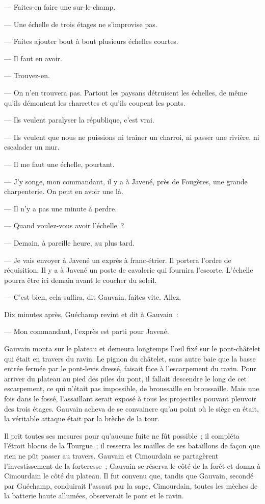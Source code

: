 \documentclass[french,twoside]{book} %
\begin{document}
— Faites-en faire une sur-le-champ.\par
— Une échelle de trois étages ne s’improvise pas.\par
— Faites ajouter bout à bout plusieurs échelles courtes.\par
— Il faut en avoir.\par
— Trouvez-en.\par
— On n’en trouvera pas. Partout les paysans détruisent les échelles, de même qu’ils démontent les charrettes et qu’ils coupent les ponts.\par
— Ils veulent paralyser la république, c’est vrai.\par
 — Ils veulent que nous ne puissions ni traîner un charroi, ni passer une rivière, ni escalader un mur.\par
— Il me faut une échelle, pourtant.\par
— J’y songe, mon commandant, il y a à Javené, près de Fougères, une grande charpenterie. On peut en avoir une là.\par
— Il n’y a pas une minute à perdre.\par
— Quand voulez-vous avoir l’échelle ?\par
— Demain, à pareille heure, au plus tard.\par
— Je vais envoyer à Javené un exprès à franc-étrier. Il portera l’ordre de réquisition. Il y a à Javené un poste de cavalerie qui fournira l’escorte. L’échelle pourra être ici demain avant le coucher du soleil.\par
— C’est bien, cela suffira, dit Gauvain, faites vite. Allez.\par
Dix minutes après, Guéchamp revint et dit à Gauvain :\par
— Mon commandant, l’exprès est parti pour Javené.\par
Gauvain monta sur le plateau et demeura longtemps l’œil fixé sur le pont-châtelet qui était en travers du ravin. Le pignon du châtelet, sans autre baie que la basse entrée fermée par le pont-levis dressé, faisait face à l’escarpement du ravin. Pour arriver du plateau au pied des piles du pont, il fallait descendre le long de cet escarpement, ce qui n’était pas impossible, de broussaille en broussaille. Mais une fois dans le fossé, l’assaillant serait exposé à tous les projectiles pouvant pleuvoir des trois étages. Gauvain acheva de se convaincre qu’au point où le siège en était, la véritable attaque était par la brèche de la tour.\par
 Il prit toutes ses mesures pour qu’aucune fuite ne fût possible ; il compléta l’étroit blocus de la Tourgue ; il resserra les mailles de ses bataillons de façon que rien ne pût passer au travers. Gauvain et Cimourdain se partagèrent l’investissement de la forteresse ; Gauvain se réserva le côté de la forêt et donna à Cimourdain le côté du plateau. Il fut convenu que, tandis que Gauvain, secondé par Guéchamp, conduirait l’assaut par la sape, Cimourdain, toutes les mèches de la batterie haute allumées, observerait le pont et le ravin.
\end{document}
